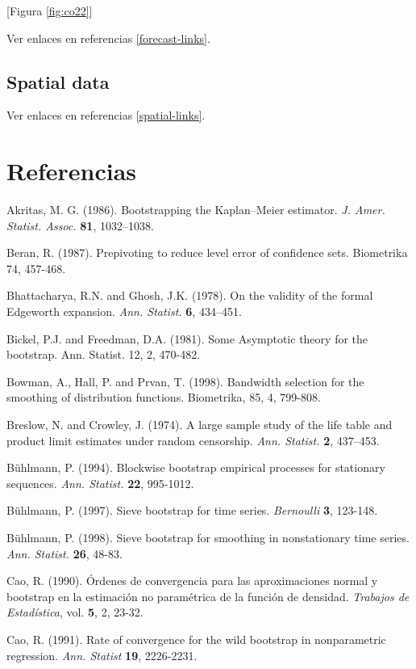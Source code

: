 \documentclass[]{book}
\theoremstyle{definition}
\theoremstyle{definition}
\theoremstyle{definition}
\theoremstyle{remark}
\begin{document}
{[}Figura \ref{fig:co22}{]}

Ver enlaces en referencias \ref{forecast-links}.

\section{Spatial data}\label{spatial-data}

Ver enlaces en referencias \ref{spatial-links}.

\chapter*{Referencias}\label{referencias}

Akritas, M. G. (1986). Bootstrapping the Kaplan--Meier estimator.
\emph{J. Amer. Statist. Assoc.} \textbf{81}, 1032--1038.

Beran, R. (1987). Prepivoting to reduce level error of confidence sets.
Biometrika 74, 457-468.

Bhattacharya, R.N. and Ghosh, J.K. (1978). On the validity of the formal
Edgeworth expansion. \emph{Ann. Statist.} \textbf{6}, 434--451.

Bickel, P.J. and Freedman, D.A. (1981). Some Asymptotic theory for the
bootstrap. Ann. Statist. 12, 2, 470-482.

Bowman, A., Hall, P. and Prvan, T. (1998). Bandwidth selection for the
smoothing of distribution functions. Biometrika, 85, 4, 799-808.

Breslow, N. and Crowley, J. (1974). A large sample study of the life
table and product limit estimates under random censorship. \emph{Ann.
Statist.} \textbf{2}, 437--453.

Bühlmann, P. (1994). Blockwise bootstrap empirical processes for
stationary sequences. \emph{Ann. Statist.} \textbf{22}, 995-1012.

Bühlmann, P. (1997). Sieve bootstrap for time series. \emph{Bernoulli}
\textbf{3}, 123-148.

Bühlmann, P. (1998). Sieve bootstrap for smoothing in nonstationary time
series. \emph{Ann. Statist.} \textbf{26}, 48-83.

Cao, R. (1990). Órdenes de convergencia para las aproximaciones normal y
bootstrap en la estimación no paramétrica de la función de densidad.
\emph{Trabajos de Estadística}, vol. \textbf{5}, 2, 23-32.

Cao, R. (1991). Rate of convergence for the wild bootstrap in
nonparametric regression. \emph{Ann. Statist} \textbf{19}, 2226-2231.
\end{document}
